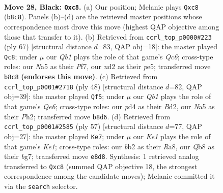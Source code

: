\documentclass[11pt]{article}
\begin{document}
\clearpage

\begin{figure}[p]\centering
\begin{subfigure}{0.46\textwidth}\centering
\resizebox{\linewidth}{!}{%
\newchessgame
\chessboard[
  setfen={rqB1k2r/p3b1pp/8/n2p4/p2P3P/4P1P1/1B1N2K1/1Q2R3 b - - 0 28},
  showmover=false,
  pgfstyle=straightmove, color=movearrow, markmove={b8-c8}
]}
\caption{}
\end{subfigure}\hfill
\begin{subfigure}{0.46\textwidth}\centering
\resizebox{\linewidth}{!}{%
\newchessgame
\chessboard[
  setfen={4k2r/r4p2/8/4Pp2/3PnP2/b1q1BRpP/6Q1/1R1N3K b k - 1 34},
  showmover=false,
  pgfstyle=straightmove, color=movearrow, markmove={c3-c8}
]}
\caption{}
\end{subfigure}
\\[4pt]
\begin{subfigure}{0.46\textwidth}\centering
\resizebox{\linewidth}{!}{%
\newchessgame
\chessboard[
  setfen={3qr3/4b1k1/pp2Qn1p/6p1/3P4/6P1/PP1BPP1P/2R3K1 w - - 3 25},
  showmover=false,
  pgfstyle=straightmove, color=movearrow, markmove={e6-f5}
]}
\caption{}
\end{subfigure}\hfill
\begin{subfigure}{0.46\textwidth}\centering
\resizebox{\linewidth}{!}{%
\newchessgame
\chessboard[
  setfen={r1r1kb1Q/5pB1/1q2p1p1/8/8/p4P2/1P2N1PP/1K1N3R b - - 7 29},
  showmover=false,
  pgfstyle=straightmove, color=movearrow, markmove={e8-e7}
]}
\caption{}
\end{subfigure}
\caption{\textbf{Move 28, Black: \texttt{Qxc8}.} (a) Our position; Melanie plays \texttt{Qxc8} (\texttt{b8c8}). Panels (b)--(d) are the retrieved master positions whose correspondence most drove this move (highest QAP objective among those that transfer to it). (b) Retrieved from \texttt{ccrl\_top\_p0000\#223} (ply 67) [structural distance $d$=83, QAP obj=18]: the master played \texttt{Qc8}; under $\mu$ our \emph{Qb1} plays the role of that game's \emph{Qc6}; cross-type roles: our \emph{N}a5 as their \emph{P}f7, our \emph{n}d2 as their \emph{p}e5; transferred move \texttt{b8c8} \textbf{(endorses this move)}. (c) Retrieved from \texttt{ccrl\_top\_p0001\#2718} (ply 48) [structural distance $d$=82, QAP obj=39]: the master played \texttt{Qf5}; under $\mu$ our \emph{Qb1} plays the role of that game's \emph{Qe6}; cross-type roles: our \emph{p}d4 as their \emph{B}d2, our \emph{N}a5 as their \emph{P}h2; transferred move \texttt{b8d6}. (d) Retrieved from \texttt{ccrl\_top\_p0001\#2585} (ply 57) [structural distance $d$=77, QAP obj=27]: the master played \texttt{Ke7}; under $\mu$ our \emph{Ke1} plays the role of that game's \emph{Ke1}; cross-type roles: our \emph{b}b2 as their \emph{R}a8, our \emph{Q}b8 as their \emph{b}g7; transferred move \texttt{e8d8}. Synthesis: 1 retrieved analog transferred to \texttt{Qxc8} (summed QAP objective 18, the strongest correspondence among the candidate moves); Melanie committed it via the \texttt{search} selector.}
\label{fig:thought-m55}
\end{figure}
\end{document}
